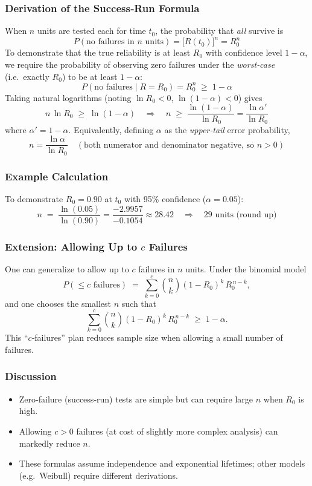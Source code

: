 \documentclass[twoside]{book}
\begin{document}
\subsubsection{Derivation of the Success‐Run Formula}
When \(n\) units are tested each for time \(t_0\), the probability that \emph{all} survive is
\[
  P(\text{no failures in }n\text{ units})
  = \bigl[R(t_0)\bigr]^n
  = R_0^n
\]
To demonstrate that the true reliability is at least \(R_0\) with confidence level \(1-\alpha\), we require the probability of observing zero failures under the \emph{worst‐case} (i.e.\ exactly \(R_0\)) to be at least \(1-\alpha\):
\[
  P(\text{no failures}\mid R=R_0)
  = R_0^n
  \;\ge\; 1-\alpha
\]
Taking natural logarithms (noting \(\ln R_0<0\), \(\ln(1-\alpha)<0\)) gives
\[
  n\,\ln R_0 \;\ge\;\ln(1-\alpha)
  \quad\Longrightarrow\quad
  n \;\ge\;\frac{\ln(1-\alpha)}{\ln R_0}
  = \frac{\ln \alpha'}{\ln R_0}
\]
where \(\alpha' = 1-\alpha\).  Equivalently, defining \(\alpha\) as the \emph{upper‐tail} error probability,
\[
  n = \frac{\ln\alpha}{\ln R_0}
  \quad(\text{both numerator and denominator negative, so }n>0)
\]

\subsubsection{Example Calculation}
To demonstrate \(R_0=0.90\) at \(t_0\) with 95\% confidence (\(\alpha=0.05\)):
\[
  n \;=\;\frac{\ln(0.05)}{\ln(0.90)}
     = \frac{-2.9957}{-0.1054}
     \approx 28.42
     \quad\Longrightarrow\quad 29\text{ units (round up)}
\]

\subsubsection{Extension: Allowing Up to \(c\) Failures}
One can generalize to allow up to \(c\) failures in \(n\) units.  Under the binomial model
\[
  P(\le c \text{ failures}) \;=\;
    \sum_{k=0}^c \binom{n}{k} (1-R_0)^k \, R_0^{\,n-k},
\]
and one chooses the smallest \(n\) such that
\[
  \sum_{k=0}^c \binom{n}{k} (1-R_0)^k \, R_0^{\,n-k} \;\ge\; 1-\alpha.
\]
This “\(c\)‑failures” plan reduces sample size when allowing a small number of failures.

\subsubsection{Discussion}
\begin{itemize}
  \item Zero‐failure (success‐run) tests are simple but can require large \(n\) when \(R_0\) is high.
  \item Allowing \(c>0\) failures (at cost of slightly more complex analysis) can markedly reduce \(n\).
  \item These formulas assume independence and exponential lifetimes; other models (e.g.\ Weibull) require different derivations.
\end{itemize}
\end{document}
